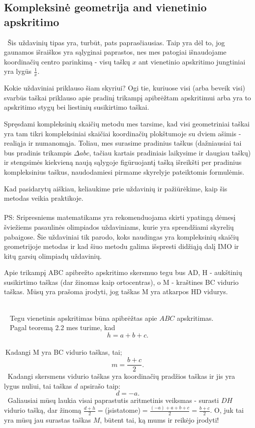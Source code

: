 \subsection{Kompleksinė geometrija and vienetinio apskritimo}

 $~$ Šis uždavinių tipas yra, turbūt, pats paprasčiausias. Taip yra dėl to, jog gaunamos 
išraiškos yra sąlyginai paprastos, nes mes patogiai išnaudojame koordinačių centro parinkimą - visų taškų $x$ ant vienetinio apskritimo jungtiniai yra lygūs $\frac {1}{x}$. 
  
  
  Kokie uždaviniai priklauso šiam skyriui? Ogi tie, kuriuose visi (arba beveik visi) svarbūs taškai priklauso apie pradinį trikampį apibrėžtam apskritimui arba yra to apskritimo stygų bei liestinių susikirtimo taškai. 
  
  Spręsdami kompleksinių skaičių metodu mes tarsime, kad visi geometriniai taškai yra tam tikri kompleksiniai skaičiai koordinačių plokštumoje su dviem ašimis - realiąja ir numanomąja. Toliau, mes surasime pradinius taškus (dažniausiai tai bus pradinis trikampis $\Delta abc$, tačiau kartais pradiniais laikysime ir daugiau taškų) ir stengsimės kiekvieną naują sąlygoje figūruojantį tašką išreikšti per pradinius kompleksinius taškus, naudodamiesi pirmame skyrelyje pateiktomis formulėmis.
  
  Kad pasidarytų aiškiau, keliaukime prie uždavinių ir pažiūrėkime, kaip šis metodas veikia praktikoje.
\\
\\
PS: Sripresniems matematikams yra rekomenduojama skirti ypatingą dėmesį šviežiems
pasaulinės olimpiados uždaviniams, kurie yra sprendžiami skyrelių pabaigose. Šie
uždaviniai tik parodo, koks naudingas yra kompleksinių skaičių geometrijoje metodas
ir kad šiuo metodu galima išspresti didžiąją dalį IMO ir kitų garsių olimpiadų uždavinių.

\begin{pavnr}

Apie trikampį ABC apibrežto apskritimo skersmuo tegu bus AD, H - aukštinių susikirtimo
taškas (dar žinomas kaip ortocentras), o M - kraštines BC vidurio taškas. Mūsų yra prašoma įrodyti, jog taškas M yra atkarpos HD vidurys.
\end{pavnr}
\begin{sprendimas}
\\ $ \phantom{a}$ Tegu vienetinis apskritimas būna apibrėžtas apie $ABC$ apskritimas. 
\\ $ \phantom{a}$ Pagal teoremą 2.2 mes turime, kad
 $$ h = a+b+c.$$
 \\ $~$Kadangi M yra BC vidurio taškas, tai; $$m= \frac{b+c}{2}.$$
$ ~$   Kadangi skersmens vidurio taškas yra koordinačių pradžios taškas ir jis yra lygus nuliui, tai taškas $d$  apsirašo taip: $$d= -a.$$
$ ~$   Galiausiai mūsų laukia visai paprastutis aritmetinis veiksmas - surasti $DH$ vidurio tašką, dar žinomą $ \frac{d+h}{2} =$(įsistatome)$= \frac {(-a)+a+b+c}{2}= \frac{b+c}{2}$. O, juk tai yra mūsų jau surastas taškas $M$, būtent tai, ką mums ir reikėjo įrodyti!
\end{sprendimas}


